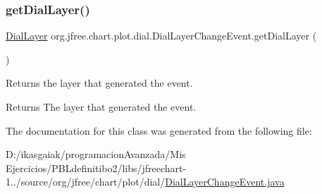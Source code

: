 \subsubsection{\texorpdfstring{get\+Dial\+Layer()}{getDialLayer()}}
{\footnotesize\ttfamily \mbox{\hyperlink{interfaceorg_1_1jfree_1_1chart_1_1plot_1_1dial_1_1_dial_layer}{Dial\+Layer}} org.\+jfree.\+chart.\+plot.\+dial.\+Dial\+Layer\+Change\+Event.\+get\+Dial\+Layer (\begin{DoxyParamCaption}{ }\end{DoxyParamCaption})}

Returns the layer that generated the event.

\begin{DoxyReturn}{Returns}
The layer that generated the event. 
\end{DoxyReturn}


The documentation for this class was generated from the following file\+:\begin{DoxyCompactItemize}
\item 
D\+:/ikasgaiak/programacion\+Avanzada/\+Mis Ejercicios/\+P\+B\+Ldefinitibo2/libs/jfreechart-\/1../source/org/jfree/chart/plot/dial/\mbox{\hyperlink{_dial_layer_change_event_8java}{Dial\+Layer\+Change\+Event.\+java}}\end{DoxyCompactItemize}
